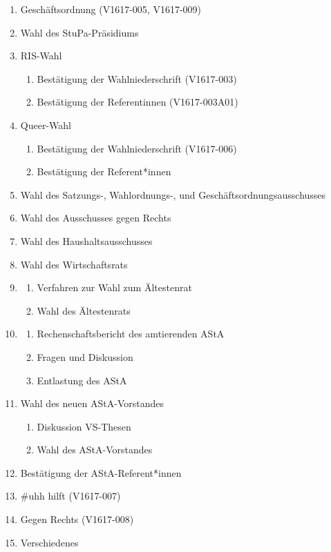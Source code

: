 \documentclass[ngerman,headheight=70pt]{scrartcl}
\begin{document}
    \begin{enumerate}[label={\textbf{Top \theenumi}},leftmargin=*]
        \item Geschäftsordnung (V1617-005, V1617-009)
        \item Wahl des StuPa-Präsidiums
        \item RIS-Wahl
            \begin{enumerate}
                \item Bestätigung der Wahlniederschrift (V1617-003)
                \item Bestätigung der Referentinnen (V1617-003A01)
            \end{enumerate}
        \item Queer-Wahl
            \begin{enumerate}
                \item Bestätigung der Wahlniederschrift (V1617-006)
                \item Bestätigung der Referent*innen
            \end{enumerate}
        \item Wahl des Satzungs-, Wahlordnungs-, und Geschäftsordnungsausschusses
        \item Wahl des Ausschusses gegen Rechts
        \item Wahl des Haushaltsausschusses
        \item Wahl des Wirtschaftsrats
        \item
            \begin{enumerate}
                \item Verfahren zur Wahl zum Ältestenrat
                \item Wahl des Ältestenrats
            \end{enumerate}
        \item
            \begin{enumerate}
                \item Rechenschaftsbericht des amtierenden AStA
                \item Fragen und Diskussion
                \item Entlastung des AStA
            \end{enumerate}
        \item Wahl des neuen AStA-Vorstandes
            \begin{enumerate}
                \item Diskussion VS-Thesen
                \item Wahl des AStA-Vorstandes
            \end{enumerate}
        \item Bestätigung der AStA-Referent*innen
        \item \#uhh hilft (V1617-007)
        \item Gegen Rechts (V1617-008)
        \item Verschiedenes
    \end{enumerate}
\end{document}
